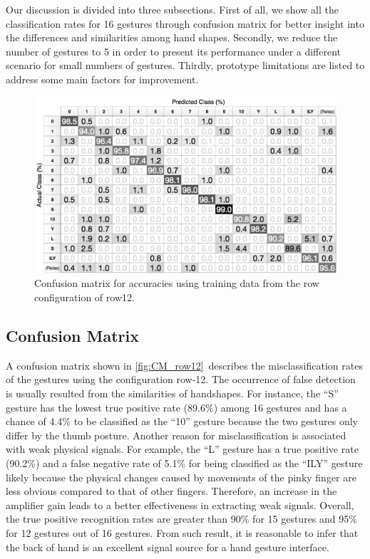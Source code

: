 \documentclass{sigchi}
\begin{document}
Our discussion is divided into three subsections. 
First of all, we show all the classification rates for 16 gestures through confusion matrix for better insight into the differences and similarities among hand shapes.
Secondly, we reduce the number of gestures to 5 in order to present its performance under a different scenario for small numbers of gestures.
Thirdly, prototype limitations are listed to address some main factors for improvement.
\begin{figure}[h]
  \begin{center}
  \includegraphics[width=1\columnwidth]{figures/CM_row12_v2.pdf}
  \caption{Confusion matrix for accuracies using training data from the row configuration of row12.}
  \label{fig:CM_row12}
  \end{center}
\end{figure}
\subsection{Confusion Matrix}

A confusion matrix shown in \autoref{fig:CM_row12}\ describes the misclassification rates of the gestures using the configuration row-12.
The occurrence of false detection is usually resulted from the similarities of handshapes.
For instance, the ``S'' gesture has the lowest true positive rate (89.6\%) among 16 gestures and has a chance of 4.4\% to be classified as the ``10'' gesture because the two gestures only differ by the thumb posture.
Another reason for misclassification is associated with weak physical signals.
For example, the ``L'' gesture has a true positive rate (90.2\%) and a false negative rate of 5.1\% for being classified as the ``ILY'' gesture likely because the  physical changes caused by movements of the pinky finger are less obvious compared to that of other fingers. Therefore, an increase in the amplifier gain leads to a better effectiveness in extracting weak signals.
Overall, the true positive recognition rates are greater than 90\% for 15 gestures and 95\% for 12 gestures out of 16 gestures. From such result, it is reasonable to infer that the back of hand is an excellent signal source for a hand gesture interface.
\end{document}
